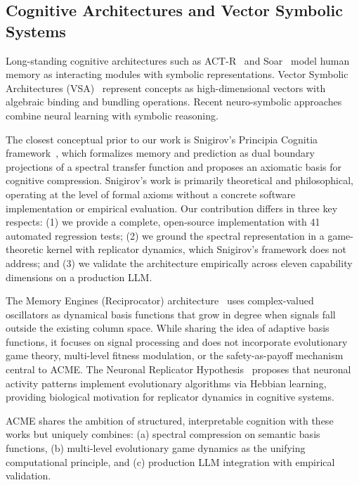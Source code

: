 \documentclass[review]{elsarticle}
\begin{document}
\subsection{Cognitive Architectures and Vector Symbolic Systems}

Long-standing cognitive architectures such as ACT-R~\cite{anderson2004integrated}
and Soar~\cite{laird2012soar} model human memory as interacting modules with
symbolic representations. Vector Symbolic Architectures (VSA)~\cite{gayler2003vector,
kanerva2009hyperdimensional} represent concepts as high-dimensional vectors
with algebraic binding and bundling operations. Recent neuro-symbolic
approaches~\cite{garcez2020neurosymbolic} combine neural learning with symbolic
reasoning.

The closest conceptual prior to our work is Snigirov's Principia Cognitia
framework~\cite{snigirov2025pc, snigirov2025pcwaves}, which formalizes memory
and prediction as dual boundary projections of a spectral transfer function
and proposes an axiomatic basis for cognitive compression. Snigirov's work
is primarily theoretical and philosophical, operating at the level of formal
axioms without a concrete software implementation or empirical evaluation.
Our contribution differs in three key respects: (1) we provide a complete,
open-source implementation with 41 automated regression tests; (2) we ground
the spectral representation in a game-theoretic kernel with replicator
dynamics, which Snigirov's framework does not address; and (3) we validate the
architecture empirically across eleven capability dimensions on a production
LLM.

The Memory Engines (Reciprocator) architecture~\cite{geometer2025memory}
uses complex-valued oscillators as dynamical basis functions that grow
in degree when signals fall outside the existing column space. While sharing
the idea of adaptive basis functions, it focuses on signal processing and does
not incorporate evolutionary game theory, multi-level fitness modulation, or
the safety-as-payoff mechanism central to ACME. The Neuronal Replicator
Hypothesis~\cite{fernando2010neuronal} proposes that neuronal activity patterns
implement evolutionary algorithms via Hebbian learning, providing biological
motivation for replicator dynamics in cognitive systems.

ACME shares the ambition of structured, interpretable cognition with these
works but uniquely combines: (a) spectral compression on semantic basis
functions, (b) multi-level evolutionary game dynamics as the unifying
computational principle, and (c) production LLM integration with empirical
validation.
\end{document}
